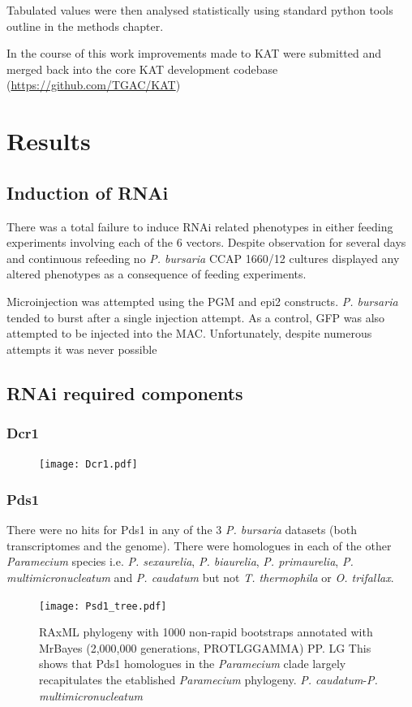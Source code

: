Tabulated values were then analysed statistically
using standard python tools outline in the methods chapter.

In the course of this work improvements made to KAT were submitted and merged
back into the core KAT development codebase (\url{https://github.com/TGAC/KAT})

\section{Results}

\subsection{Induction of RNAi}

There was a total failure to induce RNAi related phenotypes
in either feeding experiments involving each of the 6 vectors. 
Despite observation for several days and continuous refeeding
no \textit{P. bursaria} CCAP 1660/12 cultures displayed any
altered phenotypes as a consequence of feeding experiments. 

Microinjection was attempted using the PGM and epi2 constructs.
\textit{P. bursaria} tended to burst after a single injection attempt.
As a control, GFP was also attempted to be injected into the MAC.
Unfortunately, despite numerous attempts it was never possible


\subsection{RNAi required components}

\subsubsection{Dcr1}

\begin{figure}
    \texttt{[image: Dcr1.pdf]}
    \caption[RAxMl 1000 bootstraps MrBayes PP]{}
    \label{fig:dcr1}
\end{figure}


\subsubsection{Pds1}

There were no hits for Pds1 in any of the 3 \textit{P. bursaria} datasets 
(both transcriptomes and the genome).  
There were homologues in each of the other \textit{Paramecium} species
i.e. \textit{P. sexaurelia}, \textit{P. biaurelia}, \textit{P. primaurelia},
\textit{P. multimicronucleatum} and \textit{P. caudatum} but not
\textit{T. thermophila} or \textit{O. trifallax}.
\begin{figure}
    \texttt{[image: Psd1\_tree.pdf]}
    \caption[Phylogeny of Pds1 Sequences]{RAxML phylogeny with 1000 non-rapid
        bootstraps annotated with MrBayes (2,000,000 generations, PROTLGGAMMA) PP. LG This shows that Pds1 homologues
in the \textit{Paramecium} clade largely recapitulates the etablished
\textit{Paramecium} phylogeny.  \textit{P. caudatum}-\textit{P. multimicronucleatum}}
\label{fig:pds1}
\end{figure}

